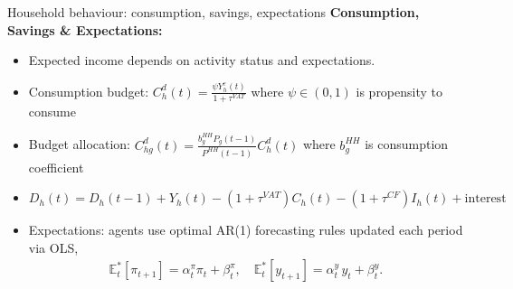 \documentclass[9pt]{beamer}
\begin{document}
\begin{frame}{Household behaviour: consumption, savings, expectations}
    \textbf{Consumption, Savings \& Expectations:}
    \begin{itemize}\setlength\itemsep{0.1em}
        \item Expected income depends on activity status and expectations.
        \item Consumption budget: $C^d_h(t) = \frac{\psi Y^e_h(t)}{1 + \tau^{VAT}}$ where $\psi \in (0,1)$ is propensity to consume
        \item Budget allocation: $C^d_{hg}(t) = \frac{b^{HH}_g P_g(t-1)}{P^{HH}(t-1)}C^d_h(t)$ where $b^{HH}_g$ is consumption coefficient
        \item $D_h(t) = D_h(t-1) + Y_h(t) - (1+\tau^{VAT})C_h(t) - (1+\tau^{CF})I_h(t) + \text{interest}$
        \item Expectations: agents use optimal AR(1) forecasting rules updated each period via OLS,
        \begin{align*}
        \mathbb{E}^*_t[\pi_{t+1}] = \alpha^\pi_t \pi_t + \beta^\pi_t, \quad
        \mathbb{E}^*_t[y_{t+1}] = \alpha^y_t\, y_t + \beta^y_t.
        \end{align*}
    \end{itemize}
\end{frame}
\end{document}
